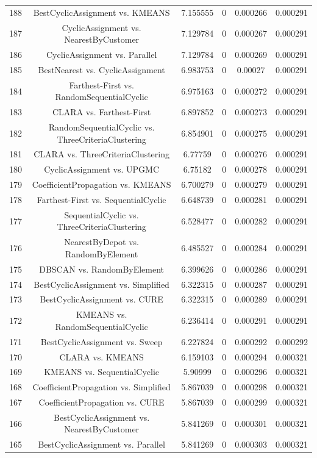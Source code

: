 \documentclass[a4paper,10pt]{article}
\begin{document}
\begin{landscape}
\begin{table}[!htp]
\begin{tabular}{cccccc}
188&BestCyclicAssignment vs. KMEANS&7.155555&0&0.000266&0.000291\\
187&CyclicAssignment vs. NearestByCustomer&7.129784&0&0.000267&0.000291\\
186&CyclicAssignment vs. Parallel&7.129784&0&0.000269&0.000291\\
185&BestNearest vs. CyclicAssignment&6.983753&0&0.00027&0.000291\\
184&Farthest-First vs. RandomSequentialCyclic&6.975163&0&0.000272&0.000291\\
183&CLARA vs. Farthest-First&6.897852&0&0.000273&0.000291\\
182&RandomSequentialCyclic vs. ThreeCriteriaClustering&6.854901&0&0.000275&0.000291\\
181&CLARA vs. ThreeCriteriaClustering&6.77759&0&0.000276&0.000291\\
180&CyclicAssignment vs. UPGMC&6.75182&0&0.000278&0.000291\\
179&CoefficientPropagation vs. KMEANS&6.700279&0&0.000279&0.000291\\
178&Farthest-First vs. SequentialCyclic&6.648739&0&0.000281&0.000291\\
177&SequentialCyclic vs. ThreeCriteriaClustering&6.528477&0&0.000282&0.000291\\
176&NearestByDepot vs. RandomByElement&6.485527&0&0.000284&0.000291\\
175&DBSCAN vs. RandomByElement&6.399626&0&0.000286&0.000291\\
174&BestCyclicAssignment vs. Simplified&6.322315&0&0.000287&0.000291\\
173&BestCyclicAssignment vs. CURE&6.322315&0&0.000289&0.000291\\
172&KMEANS vs. RandomSequentialCyclic&6.236414&0&0.000291&0.000291\\
171&BestCyclicAssignment vs. Sweep&6.227824&0&0.000292&0.000292\\
170&CLARA vs. KMEANS&6.159103&0&0.000294&0.000321\\
169&KMEANS vs. SequentialCyclic&5.90999&0&0.000296&0.000321\\
168&CoefficientPropagation vs. Simplified&5.867039&0&0.000298&0.000321\\
167&CoefficientPropagation vs. CURE&5.867039&0&0.000299&0.000321\\
166&BestCyclicAssignment vs. NearestByCustomer&5.841269&0&0.000301&0.000321\\
165&BestCyclicAssignment vs. Parallel&5.841269&0&0.000303&0.000321\\

\end{tabular}
\end{table}
\end{landscape}
\end{document}
